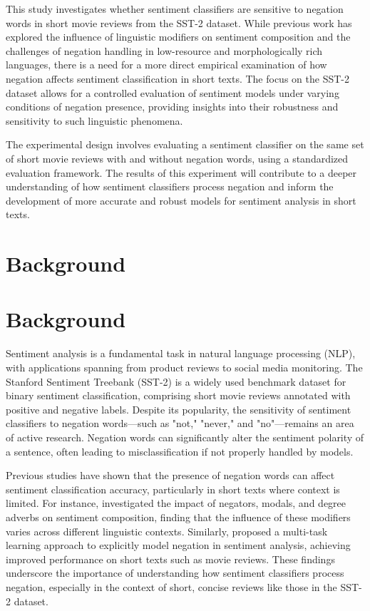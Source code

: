 \documentclass{article}
\begin{document}
This study investigates whether sentiment classifiers are sensitive to negation words in short movie reviews from the SST-2 dataset. While previous work has explored the influence of linguistic modifiers on sentiment composition and the challenges of negation handling in low-resource and morphologically rich languages, there is a need for a more direct empirical examination of how negation affects sentiment classification in short texts. The focus on the SST-2 dataset allows for a controlled evaluation of sentiment models under varying conditions of negation presence, providing insights into their robustness and sensitivity to such linguistic phenomena.

The experimental design involves evaluating a sentiment classifier on the same set of short movie reviews with and without negation words, using a standardized evaluation framework. The results of this experiment will contribute to a deeper understanding of how sentiment classifiers process negation and inform the development of more accurate and robust models for sentiment analysis in short texts.
\section{Background}
\section*{Background}

Sentiment analysis is a fundamental task in natural language processing (NLP), with applications spanning from product reviews to social media monitoring. The Stanford Sentiment Treebank (SST-2) is a widely used benchmark dataset for binary sentiment classification, comprising short movie reviews annotated with positive and negative labels. Despite its popularity, the sensitivity of sentiment classifiers to negation words—such as "not," "never," and "no"—remains an area of active research. Negation words can significantly alter the sentiment polarity of a sentence, often leading to misclassification if not properly handled by models.

Previous studies have shown that the presence of negation words can affect sentiment classification accuracy, particularly in short texts where context is limited. For instance, \cite{1712.01794v1} investigated the impact of negators, modals, and degree adverbs on sentiment composition, finding that the influence of these modifiers varies across different linguistic contexts. Similarly, \cite{1906.07610v2} proposed a multi-task learning approach to explicitly model negation in sentiment analysis, achieving improved performance on short texts such as movie reviews. These findings underscore the importance of understanding how sentiment classifiers process negation, especially in the context of short, concise reviews like those in the SST-2 dataset.
\end{document}
